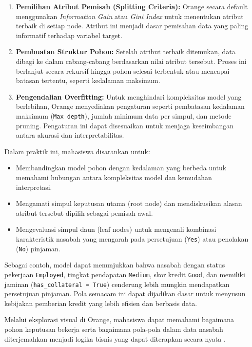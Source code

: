 \begin{enumerate}
	\item \textbf{Pemilihan Atribut Pemisah (Splitting Criteria):} Orange secara default menggunakan \textit{Information Gain} atau \textit{Gini Index} untuk menentukan atribut terbaik di setiap node. Atribut ini menjadi dasar pemisahan data yang paling informatif terhadap variabel target.
	
	\item \textbf{Pembuatan Struktur Pohon:} Setelah atribut terbaik ditemukan, data dibagi ke dalam cabang-cabang berdasarkan nilai atribut tersebut. Proses ini berlanjut secara rekursif hingga pohon selesai terbentuk atau mencapai batasan tertentu, seperti kedalaman maksimum.
	
	\item \textbf{Pengendalian Overfitting:} Untuk menghindari kompleksitas model yang berlebihan, Orange menyediakan pengaturan seperti pembatasan kedalaman maksimum (\texttt{Max depth}), jumlah minimum data per simpul, dan metode pruning. Pengaturan ini dapat disesuaikan untuk menjaga keseimbangan antara akurasi dan interpretabilitas.
\end{enumerate}

Dalam praktik ini, mahasiswa disarankan untuk:

\begin{itemize}
	\item Membandingkan model pohon dengan kedalaman yang berbeda untuk memahami hubungan antara kompleksitas model dan kemudahan interpretasi.
	\item Mengamati simpul keputusan utama (root node) dan mendiskusikan alasan atribut tersebut dipilih sebagai pemisah awal.
	\item Mengevaluasi simpul daun (leaf nodes) untuk mengenali kombinasi karakteristik nasabah yang mengarah pada persetujuan (\texttt{Yes}) atau penolakan (\texttt{No}) pinjaman.
\end{itemize}

Sebagai contoh, model dapat menunjukkan bahwa nasabah dengan status pekerjaan \texttt{Employed}, tingkat pendapatan \texttt{Medium}, skor kredit \texttt{Good}, dan memiliki jaminan (\texttt{has\_collateral = True}) cenderung lebih mungkin mendapatkan persetujuan pinjaman. Pola semacam ini dapat dijadikan dasar untuk menyusun kebijakan pemberian kredit yang lebih efisien dan berbasis data.

Melalui eksplorasi visual di Orange, mahasiswa dapat memahami bagaimana pohon keputusan bekerja serta bagaimana pola-pola dalam data nasabah diterjemahkan menjadi logika bisnis yang dapat diterapkan secara nyata \cite{demsar2013orange}. 

